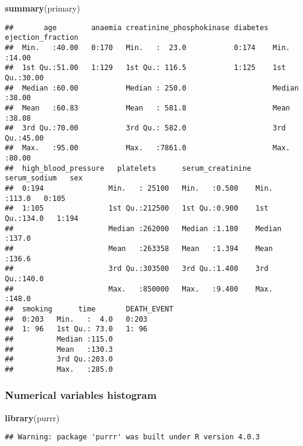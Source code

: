 \documentclass[
]{article}
\newenvironment{Shaded}{\begin{snugshade}}{\end{snugshade}}
\newcommand{\KeywordTok}[1]{\textcolor[rgb]{0.13,0.29,0.53}{\textbf{#1}}}
\newcommand{\NormalTok}[1]{#1}
\begin{document}
\begin{Shaded}
\begin{Highlighting}[]
\KeywordTok{summary}\NormalTok{(primary)}
\end{Highlighting}
\end{Shaded}

\begin{verbatim}
##       age        anaemia creatinine_phosphokinase diabetes ejection_fraction
##  Min.   :40.00   0:170   Min.   :  23.0           0:174    Min.   :14.00    
##  1st Qu.:51.00   1:129   1st Qu.: 116.5           1:125    1st Qu.:30.00    
##  Median :60.00           Median : 250.0                    Median :38.00    
##  Mean   :60.83           Mean   : 581.8                    Mean   :38.08    
##  3rd Qu.:70.00           3rd Qu.: 582.0                    3rd Qu.:45.00    
##  Max.   :95.00           Max.   :7861.0                    Max.   :80.00    
##  high_blood_pressure   platelets      serum_creatinine  serum_sodium   sex    
##  0:194               Min.   : 25100   Min.   :0.500    Min.   :113.0   0:105  
##  1:105               1st Qu.:212500   1st Qu.:0.900    1st Qu.:134.0   1:194  
##                      Median :262000   Median :1.100    Median :137.0          
##                      Mean   :263358   Mean   :1.394    Mean   :136.6          
##                      3rd Qu.:303500   3rd Qu.:1.400    3rd Qu.:140.0          
##                      Max.   :850000   Max.   :9.400    Max.   :148.0          
##  smoking      time       DEATH_EVENT
##  0:203   Min.   :  4.0   0:203      
##  1: 96   1st Qu.: 73.0   1: 96      
##          Median :115.0              
##          Mean   :130.3              
##          3rd Qu.:203.0              
##          Max.   :285.0
\end{verbatim}

\hypertarget{numerical-variables-histogram}{%
\subsubsection{Numerical variables
histogram}\label{numerical-variables-histogram}}

\begin{Shaded}
\begin{Highlighting}[]
\KeywordTok{library}\NormalTok{(purrr)}
\end{Highlighting}
\end{Shaded}

\begin{verbatim}
## Warning: package 'purrr' was built under R version 4.0.3
\end{verbatim}
\end{document}
